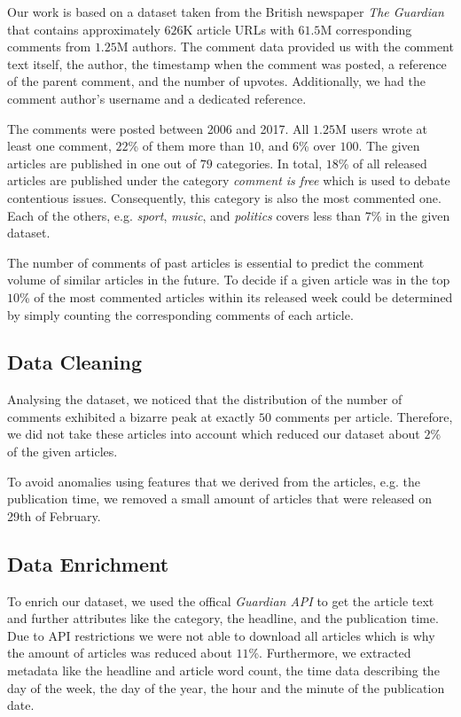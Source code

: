 Our work is based on a dataset taken from the British newspaper \textit{The Guardian} that contains approximately $626$K article URLs with $61.5$M corresponding comments from $1.25$M authors. 
The comment data provided us with the comment text itself, the author, the timestamp when the comment was posted, a reference of the parent comment, and the number of upvotes. Additionally, we had the comment author's username and a dedicated reference. 

The comments were posted between 2006 and 2017. All $1.25$M users wrote at least one comment, $22$\% of them more than $10$, and $6$\% over $100$.
The given articles are published in one out of $79$ categories. In total, $18$\% of all released articles are published under the category \textit{comment is free} which is used to debate contentious issues. Consequently, this category is also the most commented one. 
Each of the others, e.g. \textit{sport}, \textit{music}, and \textit{politics} covers less than $7$\% in the given dataset.

The number of comments of past articles is essential to predict the comment volume of similar articles in the future. 
To decide if a given article was in the top $10$\% of the most commented articles within its released week could be determined by simply counting the corresponding comments of each article.

\subsection{Data Cleaning}
Analysing the dataset, we noticed that the distribution of the number of comments exhibited a bizarre peak at exactly $50$ comments per article. Therefore, we did not take these articles into account which reduced our dataset about $2$\% of the given articles.

To avoid anomalies using features that we derived from the articles, e.g. the publication time, we removed a small amount of articles that were released on 29th of February.

\subsection{Data Enrichment}
To enrich our dataset, we used the offical \textit{Guardian API} to get the article text and further attributes like the category, the headline, and the publication time.
Due to API restrictions we were not able to download all articles which is why the amount of articles was reduced about $11$\%.
Furthermore, we extracted metadata like the headline and article word count, the time data describing the day of the week, the day of the year, the hour and the minute of the publication date.

